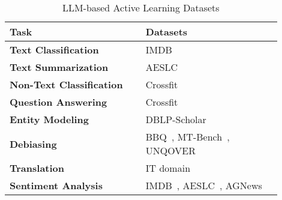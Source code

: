 \begin{table}[!t]
\centering
\small
\setlength{\tabcolsep}{0pt} %
\begin{tabular}{%
    p{0.45\linewidth}
    p{0.45\linewidth}
}
\toprule
\textbf{Task} & \textbf{Datasets} \\
\midrule
\textbf{Text Classification} & IMDB~\cite{maas-EtAl:2011:ACL-HLT2011} \\
\textbf{Text Summarization} & AESLC~\cite{zhang-tetreault-2019-email} \\
\textbf{Non-Text Classification} & Crossfit~\cite{ye2021crossfitfewshotlearningchallenge} \\
\textbf{Question Answering} & Crossfit~\cite{ye2021crossfitfewshotlearningchallenge} \\
\textbf{Entity Modeling} & DBLP-Scholar~\cite{dblpscholar} \\
\textbf{Debiasing} & BBQ~\cite{parrish2022bbqhandbuiltbiasbenchmark}, MT-Bench~\cite{zheng-etal-2023-judging}, UNQOVER~\cite{li-etal-2020-unqovering} \\
\textbf{Translation} & IT domain~\cite{koehn-knowles-2017-six} \\
\textbf{Sentiment Analysis} & IMDB~\cite{maas-EtAl:2011:ACL-HLT2011}, AESLC~\cite{zhang-tetreault-2019-email}, AGNews~\cite{NIPS2015_250cf8b5} \\
\bottomrule
\end{tabular}
\caption{LLM-based Active Learning Datasets}
\label{tab:AL-datasets}
\end{table}
